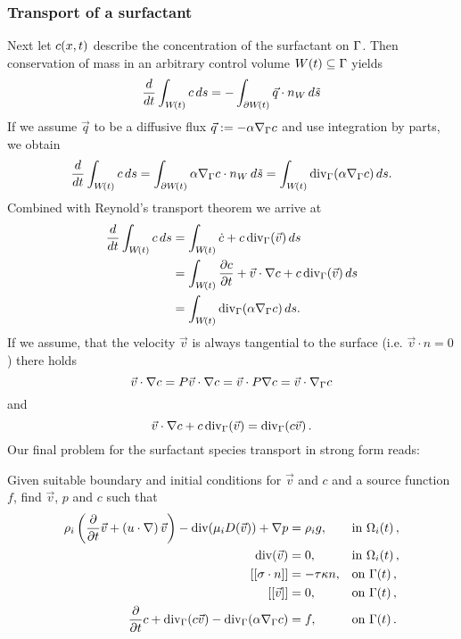 \subsubsection{Transport of a surfactant}
Next let $c\!\left(x,t\right)$ describe the concentration of the surfactant on $\Gamma$. Then conservation of mass in an arbitrary control volume $W\!\left(t\right)\subseteq\Gamma$  yields
\begin{equation}
	\frac{d}{dt}\int_{W\!\left(t\right)}c\,ds=-\int_{\partial W\!\left(t\right)}\vec q\cdot n_W \,d\tilde s
\end{equation}
If we assume $\vec q$ to be a diffusive flux $\vec q:=-\alpha \nabla_\Gamma c$ and use integration by parts, we obtain
\begin{equation}
	\frac{d}{dt}\int_{W\!\left(t\right)}c\,ds=\int_{\partial W\!\left(t\right)}\alpha \nabla_\Gamma c\cdot n_W \,d \tilde s = \int_{W\!\left(t\right)}\mathrm{div}_\Gamma\!\left(\alpha\nabla_\Gamma c\right)ds.
\end{equation}
Combined with Reynold's transport theorem we arrive at
\begin{align}
	\frac{d}{dt}\int_{W\!\left(t\right)}c\,ds&=\int_{W\!\left(t\right)}\dot c+c\,\mathrm{div}_\Gamma\!\left(\vec v\right)ds\\
	&=\int_{W\!\left(t\right)}\frac{\partial c}{\partial t}+\vec v\cdot\nabla c+c\,\mathrm{div}_\Gamma\!\left(\vec v\right)ds\\
	&=\int_{W\!\left(t\right)}\mathrm{div}_\Gamma\!\left(\alpha\nabla_\Gamma c\right)ds.
\end{align}
If we assume, that the velocity $\vec v$ is always tangential to the surface (i.e. $\vec v \cdot n = 0$) there holds
\begin{equation}
	\vec v\cdot\nabla c =P\vec v\cdot\nabla c =\vec v\cdot P\nabla c =\vec v\cdot \nabla_\Gamma c
\end{equation}
and
\begin{equation}
	\vec v\cdot\nabla c+c\,\mathrm{div}_\Gamma\!\left(\vec v\right)=\mathrm{div}_\Gamma\!\left(c \vec v\right).
\end{equation}
Our final problem for the surfactant species transport in strong form reads:
\begin{prob}
	Given suitable boundary and initial conditions for $\vec v$ and $c$ and a source function $f$, find $\vec v$, $p$ and $c$ such that
	\begin{subequations}

		\begin{align}
				\label{eq:momentum}
				\rho_i\left(\frac{\partial}{\partial t} \vec v +\left(u\cdot\nabla\right) \vec v\right) -\text{div}\of{\mu_iD\of{\vec v}}+\nabla p&=\rho_ig,&&\text{in }\domain_i\of{t},\\
				\label{eq:continuity}
				\text{div}\of{\vec v}&=0,&&\text{in }\domain_i\of{t},\\
				\left[[\sigma\cdot n\right]]&=-\tau\kappa n,&&\text{on }\boundary\of{t},\\
				\left[[\vec v\right]]&=0,&&\text{on }\boundary\of{t},\\
				\label{eq:surface}
				\frac{\partial}{\partial t}c+\mathrm{div}_\boundary\of{c \vec v}-\mathrm{div}_\boundary\of{\alpha\nabla_\boundary c}&=f, && \text{on }\boundary\of{t}.
		\end{align}
	\end{subequations}
\end{prob}
